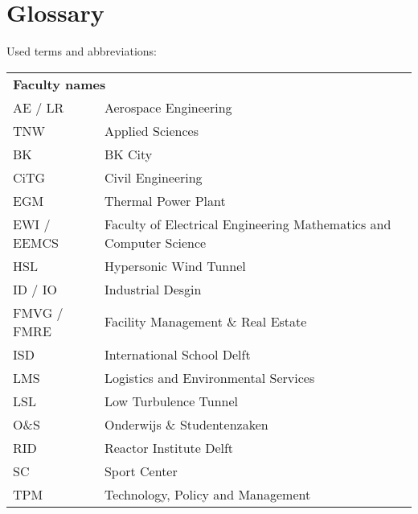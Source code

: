 \chapter{Glossary}

Used terms and abbreviations:
\begin{table}[]
\centering
\label{faculties}
\begin{tabular}{ll}
\multicolumn{2}{l}{\textbf{Faculty names}}                                       \\
AE / LR     & Aerospace Engineering                                              \\
TNW         & Applied Sciences                                                   \\
BK          & BK City                                                            \\
CiTG        & Civil Engineering                                                  \\
EGM         & Thermal Power Plant                                                \\
EWI / EEMCS & Faculty of Electrical Engineering Mathematics and Computer Science \\
HSL         & Hypersonic Wind Tunnel                                             \\
ID / IO     & Industrial Desgin                                                  \\
FMVG / FMRE & Facility Management \& Real Estate                                 \\
ISD         & International School Delft                                         \\
LMS         & Logistics and Environmental Services                               \\
LSL         & Low Turbulence Tunnel                                              \\
O\&S        & Onderwijs \& Studentenzaken                                        \\
RID         & Reactor Institute Delft                                            \\
SC          & Sport Center                                                       \\
TPM         & Technology, Policy and Management                                 
\end{tabular}
\end{table}

